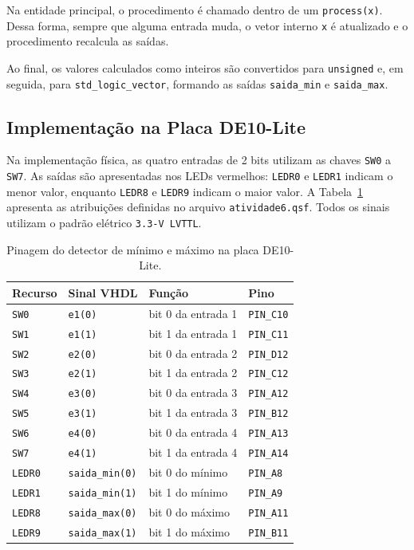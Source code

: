 \documentclass[12pt,a4paper, brazil]{article}
\begin{document}
Na entidade principal, o procedimento é chamado dentro de um \texttt{process(x)}. Dessa forma, sempre que alguma entrada muda, o vetor interno \texttt{x} é atualizado e o procedimento recalcula as saídas.

Ao final, os valores calculados como inteiros são convertidos para \texttt{unsigned} e, em seguida, para \texttt{std\_logic\_vector}, formando as saídas \texttt{saida\_min} e \texttt{saida\_max}.

\subsection{Implementação na Placa DE10-Lite}

Na implementação física, as quatro entradas de 2 bits utilizam as chaves \texttt{SW0} a \texttt{SW7}. As saídas são apresentadas nos LEDs vermelhos: \texttt{LEDR0} e \texttt{LEDR1} indicam o menor valor, enquanto \texttt{LEDR8} e \texttt{LEDR9} indicam o maior valor. A Tabela~\ref{tab:pinagem} apresenta as atribuições definidas no arquivo \texttt{atividade6.qsf}. Todos os sinais utilizam o padrão elétrico \texttt{3.3-V LVTTL}.

\begin{table}[H]
\centering
\caption{Pinagem do detector de mínimo e máximo na placa DE10-Lite.}
\label{tab:pinagem}
\begin{tabular}{@{}llll@{}}
\toprule
\textbf{Recurso} & \textbf{Sinal VHDL} & \textbf{Função} & \textbf{Pino} \\
\midrule
\texttt{SW0}   & \texttt{e1(0)}          & bit 0 da entrada 1 & \texttt{PIN\_C10} \\
\texttt{SW1}   & \texttt{e1(1)}          & bit 1 da entrada 1 & \texttt{PIN\_C11} \\
\texttt{SW2}   & \texttt{e2(0)}          & bit 0 da entrada 2 & \texttt{PIN\_D12} \\
\texttt{SW3}   & \texttt{e2(1)}          & bit 1 da entrada 2 & \texttt{PIN\_C12} \\
\texttt{SW4}   & \texttt{e3(0)}          & bit 0 da entrada 3 & \texttt{PIN\_A12} \\
\texttt{SW5}   & \texttt{e3(1)}          & bit 1 da entrada 3 & \texttt{PIN\_B12} \\
\texttt{SW6}   & \texttt{e4(0)}          & bit 0 da entrada 4 & \texttt{PIN\_A13} \\
\texttt{SW7}   & \texttt{e4(1)}          & bit 1 da entrada 4 & \texttt{PIN\_A14} \\
\texttt{LEDR0} & \texttt{saida\_min(0)} & bit 0 do mínimo    & \texttt{PIN\_A8}  \\
\texttt{LEDR1} & \texttt{saida\_min(1)} & bit 1 do mínimo    & \texttt{PIN\_A9}  \\
\texttt{LEDR8} & \texttt{saida\_max(0)} & bit 0 do máximo    & \texttt{PIN\_A11} \\
\texttt{LEDR9} & \texttt{saida\_max(1)} & bit 1 do máximo    & \texttt{PIN\_B11} \\
\bottomrule
\end{tabular}
\end{table}
\FloatBarrier
\end{document}
